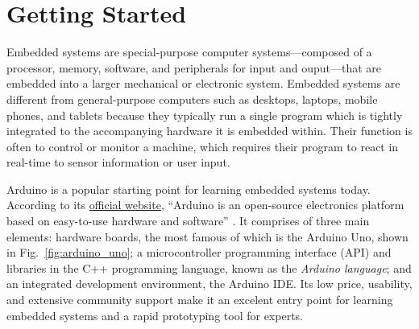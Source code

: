 
\chapter{Getting Started}
Embedded systems \parencite{leveson_embedded_2003} are special-purpose computer systems---composed of a processor, memory, software, and peripherals for input and ouput---that are embedded into a larger mechanical or electronic system.
Embedded systems are different from general-purpose computers such as desktops, laptops, mobile phones, and tablets because they typically run a single program which is tightly integrated to the accompanying hardware it is embedded within.
Their function is often to control or monitor a machine, which requires their program to react in real-time to sensor information or user input.

Arduino is a popular starting point for learning embedded systems today.
According to its \href{https://www.arduino.cc/en/Guide/Introduction}{official website}, 
``Arduino is an open-source electronics platform based on easy-to-use hardware and software'' \parencite{arduino_what_2018}.
It comprises of three main elements: 
hardware boards, the most famous of which is the Arduino Uno, shown in Fig.~\ref{fig:arduino_uno};
a microcontroller programming interface (API) and libraries in the C++ programming language, known as the \emph{Arduino language};
and an integrated development environment, the Arduino IDE.
Its low price, usability, and extensive community support make it an excelent entry point for learning embedded systems and a rapid prototyping tool for experts.

